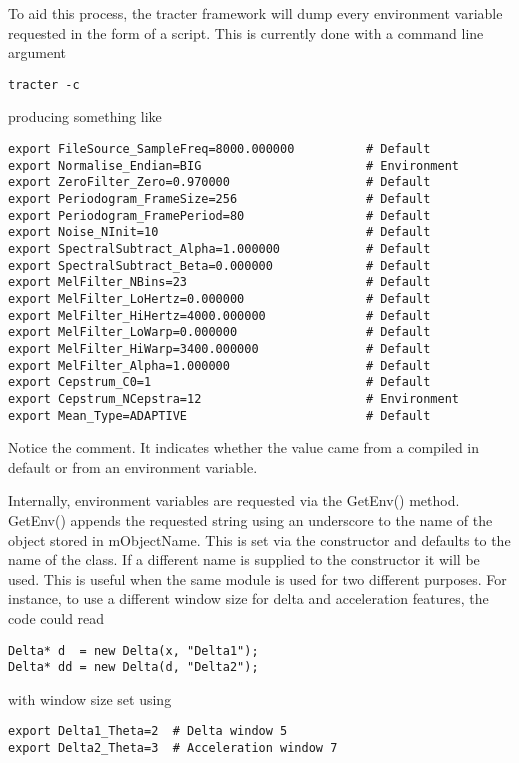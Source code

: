 To aid this process, the tracter framework will dump every environment
variable requested in the form of a script.  This is currently done
with a command line argument
\begin{verbatim}
tracter -c
\end{verbatim}
producing something like
\begin{verbatim}
export FileSource_SampleFreq=8000.000000          # Default
export Normalise_Endian=BIG                       # Environment
export ZeroFilter_Zero=0.970000                   # Default
export Periodogram_FrameSize=256                  # Default
export Periodogram_FramePeriod=80                 # Default
export Noise_NInit=10                             # Default
export SpectralSubtract_Alpha=1.000000            # Default
export SpectralSubtract_Beta=0.000000             # Default
export MelFilter_NBins=23                         # Default
export MelFilter_LoHertz=0.000000                 # Default
export MelFilter_HiHertz=4000.000000              # Default
export MelFilter_LoWarp=0.000000                  # Default
export MelFilter_HiWarp=3400.000000               # Default
export MelFilter_Alpha=1.000000                   # Default
export Cepstrum_C0=1                              # Default
export Cepstrum_NCepstra=12                       # Environment
export Mean_Type=ADAPTIVE                         # Default
\end{verbatim}

Notice the comment.  It indicates whether the value came from a
compiled in default or from an environment variable.

Internally, environment variables are requested via the GetEnv()
method.  GetEnv() appends the requested string using an underscore to
the name of the object stored in mObjectName.  This is set via the
constructor and defaults to the name of the class.  If a different
name is supplied to the constructor it will be used.  This is useful
when the same module is used for two different purposes.  For
instance, to use a different window size for delta and acceleration
features, the code could read
\begin{verbatim}
Delta* d  = new Delta(x, "Delta1");
Delta* dd = new Delta(d, "Delta2");
\end{verbatim}
with window size set using
\begin{verbatim}
export Delta1_Theta=2  # Delta window 5
export Delta2_Theta=3  # Acceleration window 7
\end{verbatim}


